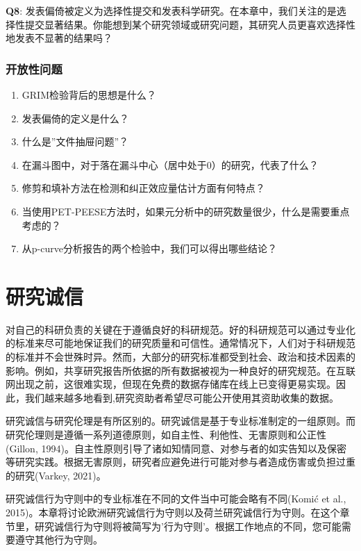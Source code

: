 \documentclass[
  letterpaper,
  DIV=11,
  numbers=noendperiod]{scrreprt}
\begin{document}
\textbf{Q8}:
发表偏倚被定义为选择性提交和发表科学研究。在本章中，我们关注的是选择性提交显著结果。你能想到某个研究领域或研究问题，其研究人员更喜欢选择性地发表不显著的结果吗？

\hypertarget{ux5f00ux653eux6027ux95eeux9898-3}{%
\subsection{开放性问题}\label{ux5f00ux653eux6027ux95eeux9898-3}}

\begin{enumerate}
\def\labelenumi{\arabic{enumi}.}
\item
  GRIM检验背后的思想是什么？
\item
  发表偏倚的定义是什么？
\item
  什么是''文件抽屉问题''？
\item
  在漏斗图中，对于落在漏斗中心（居中处于0）的研究，代表了什么？
\item
  修剪和填补方法在检测和纠正效应量估计方面有何特点？
\item
  当使用PET-PEESE方法时，如果元分析中的研究数量很少，什么是需要重点考虑的？
\item
  从p-curve分析报告的两个检验中，我们可以得出哪些结论？
\end{enumerate}


\hypertarget{sec-integrity}{%
\chapter{研究诚信}\label{sec-integrity}}

对自己的科研负责的关键在于遵循良好的科研规范。好的科研规范可以通过专业化的标准来尽可能地保证我们的研究质量和可信性。通常情况下，人们对于科研规范的标准并不会世殊时异。然而，大部分的研究标准都受到社会、政治和技术因素的影响。例如，共享研究报告所依据的所有数据被视为一种良好的研究规范。在互联网出现之前，这很难实现，但现在免费的数据存储库在线上已变得更易实现。因此，我们越来越多地看到,研究资助者希望尽可能公开使用其资助收集的数据。

研究诚信与研究伦理是有所区别的。研究诚信是基于专业标准制定的一组原则。而研究伦理则是遵循一系列道德原则，如自主性、利他性、无害原则和公正性(Gillon,
1994)。自主性原则引导了诸如知情同意、对参与者的如实告知以及保密等研究实践。根据无害原则，研究者应避免进行可能对参与者造成伤害或负担过重的研究(Varkey,
2021)。

研究诚信行为守则中的专业标准在不同的文件当中可能会略有不同(Komić et al.,
2015)。本章将讨论欧洲研究诚信行为守则以及荷兰研究诚信行为守则。在这个章节里，研究诚信行为守则将被简写为'行为守则'。根据工作地点的不同，您可能需要遵守其他行为守则。
\end{document}
